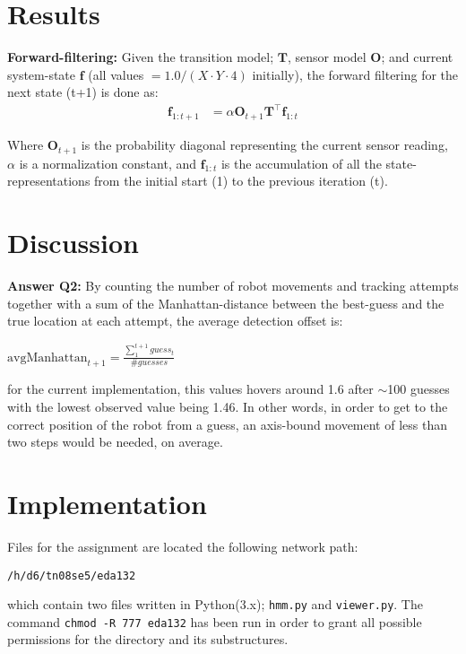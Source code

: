 \documentclass{article}
\newcommand{\mat}[1]{$\textbf{#1}$}
\newcommand{\mmat}[1]{\mathbf{#1}}
\renewcommand{\vec}[1]{$\textbf{#1}$}
\newcommand{\mvec}[1]{\mathbf{#1}}
\begin{document}
  \section*{Results}

    \textbf{Forward-filtering:} Given the transition model; \mat{T}, sensor
    model \mat{O}; and current system-state \vec{f} (all values
    $= 1.0/(X{\cdot}Y{\cdot}4)$ initially), the forward filtering for the next
    state (t+1) is done as:
    \begin{align*}
      \mvec{f}_{1:t+1} &= {\alpha}\mmat{O}_{t+1}\mmat{T}^\top\mvec{f}_{1:t}
    \end{align*}

    Where \mat{O}$_{t+1}$ is the probability diagonal representing the current
    sensor reading, $\alpha$ is a normalization constant, and $\mvec{f}_{1:t}$
    is the accumulation of all the state-representations from the initial start
    (1) to the previous iteration (t).

  \section*{Discussion}

    \textbf{Answer Q2:} By counting the number of robot movements and tracking
    attempts together with a sum of the Manhattan-distance between the
    best-guess and the true location at each attempt, the average detection
    offset is:

    \begin{center}
      $\textrm{avgManhattan}_{t+1} = \frac{\sum_{1}^{t+1} guess_t}{\#guesses}$
    \end{center}

    for the current implementation, this values hovers around 1.6 after
    $\sim$100 guesses with the lowest observed value being 1.46. In other
    words, in order to get to the correct position of the robot from a guess,
    an axis-bound movement of less than two steps would be needed, on average.

  \section*{Implementation}

    Files for the assignment are located the following network path:
    \begin{center}
      \texttt{/h/d6/tn08se5/eda132}
    \end{center}
    which contain two files written in Python(3.x); \texttt{hmm.py} and
    \texttt{viewer.py}. The command \texttt{chmod -R 777 eda132} has been run in
    order to grant all possible permissions for the directory and its
    substructures. \\
\end{document}
